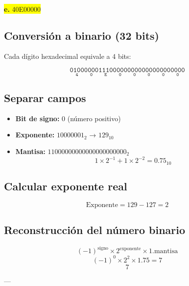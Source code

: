 \documentclass[a4paper,12pt]{article}
\begin{document}
	\begin{center}
		\colorbox{yellow}{\textbf{e.} 40E00000}
		\subsection*{Conversión a binario (32 bits)}
		Cada dígito hexadecimal equivale a 4 bits:
		
		\[
		\mathtt{
			\underset{\text{4}}{\boxed{\mathtt{0100}}}
			\underset{\text{0}}{\boxed{\mathtt{0000}}}
			\underset{\text{E}}{\boxed{\mathtt{1110}}}
			\underset{\text{0}}{\boxed{\mathtt{0000}}}
			\underset{\text{0}}{\boxed{\mathtt{0000}}}
			\underset{\text{0}}{\boxed{\mathtt{0000}}}
			\underset{\text{0}}{\boxed{\mathtt{0000}}}
			\underset{\text{0}}{\boxed{\mathtt{0000}}}
		}	
		\]
		
		\subsection*{Separar campos}
		
		\begin{itemize}
			\item \textbf{Bit de signo:} 0 (número positivo)
			\item \textbf{Exponente:} $10000001_2$ → $129_{10}$
			\item \textbf{Mantisa:} $11000000000000000000000_2$ 
			\[
			1\times2^{-1} + 1\times2^{-2} = 0.75_{10}
			\]
		\end{itemize}
		
		\subsection*{Calcular exponente real}
		
		\[
		\text{Exponente} = 129 - 127 = 2
		\]
		
		
		
		\subsection*{Reconstrucción del número binario}	
		\[
		(-1)^{\text{signo}} \times 2^{\text{exponente}} \times 1.\text{mantisa}
		\]
		\[
		(-1)^0 \times 2^2 \times 1.75 = 7
		\]
		\vspace{1em}
		\[
		\boxed{7}
		\]
		
		---
	\end{center}
\end{document}
